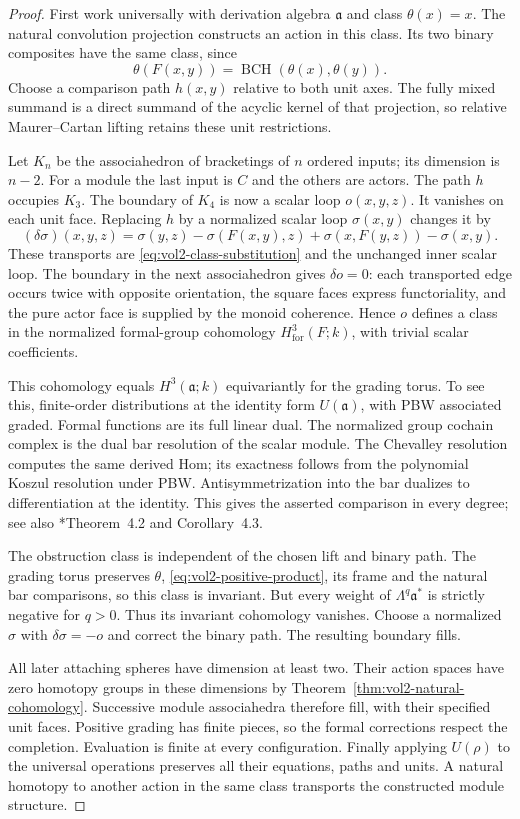 \begin{proof}
First work universally with derivation algebra $\mathfrak a$
and class $\theta(x)=x$. The natural convolution projection
constructs an action in this class. Its two binary composites
have the same class, since
\[
 \theta(F(x,y))=\operatorname{BCH}(\theta(x),\theta(y)).
\]
Choose a comparison path $h(x,y)$ relative to both unit axes.
The fully mixed summand is a direct summand of the acyclic
kernel of that projection, so relative Maurer--Cartan lifting
retains these unit restrictions.

Let $K_n$ be the associahedron of bracketings of $n$ ordered
inputs; its dimension is $n-2$. For a module the last input
is $C$ and the others are actors. The path $h$ occupies
$K_3$. The boundary of $K_4$ is now a scalar loop
$o(x,y,z)$. It vanishes on each unit face. Replacing $h$ by
a normalized scalar loop $\sigma(x,y)$ changes it by
\[
 (\delta\sigma)(x,y,z)=\sigma(y,z)-\sigma(F(x,y),z)
                +\sigma(x,F(y,z))-\sigma(x,y).
\]
These transports are \eqref{eq:vol2-class-substitution} and
the unchanged inner scalar loop. The boundary in the next
associahedron gives $\delta o=0$: each transported edge
occurs twice with opposite orientation, the square faces
express functoriality, and the pure actor face is supplied
by the monoid coherence. Hence $o$ defines a class in the
normalized formal-group cohomology $H^3_{\mathrm{for}}(F;k)$,
with trivial scalar coefficients.

This cohomology equals $H^3(\mathfrak a;k)$ equivariantly
for the grading torus. To see this, finite-order distributions
at the identity form $U(\mathfrak a)$, with PBW associated
graded. Formal functions are its full linear dual. The
normalized group cochain complex is the dual bar resolution
of the scalar module. The Chevalley resolution computes the
same derived Hom; its exactness follows from the polynomial
Koszul resolution under PBW. Antisymmetrization into the bar
dualizes to differentiation at the identity. This gives the
asserted comparison in every degree; see also
\cite{Lechner2012}*{Theorem~4.2 and Corollary~4.3}.

The obstruction class is independent of the chosen lift and
binary path. The grading torus preserves $\theta$,
\eqref{eq:vol2-positive-product}, its frame and the natural
bar comparisons, so this class is invariant. But every
weight of $\Lambda^q\mathfrak a^*$ is strictly negative
for $q>0$. Thus its invariant cohomology vanishes. Choose
a normalized $\sigma$ with $\delta\sigma=-o$ and correct
the binary path. The resulting boundary fills.

All later attaching spheres have dimension at least two.
Their action spaces have zero homotopy groups in these
dimensions by Theorem~\ref{thm:vol2-natural-cohomology}.
Successive module associahedra therefore fill, with their
specified unit faces. Positive grading has finite pieces,
so the formal corrections respect the completion. Evaluation
is finite at every configuration. Finally applying $U(\rho)$
to the universal operations preserves all their equations,
paths and units. A natural homotopy to another action in
the same class transports the constructed module structure.
\end{proof}

